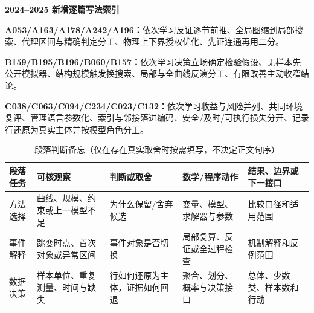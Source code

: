 \documentclass[withoutpreface,bwprint]{cumcmthesis}
\newif\ifmcmguidance
\newcommand{\MCMGuideField}[2]{\par\noindent\textbf{#1：}#2}
\newcommand{\MCMGuide}[7]{%
  \ifmcmguidance
    \begin{mcmguidebox}
      \small\color{black}
      {\color{mcmguidehead}\bfseries 写作指引}
      \MCMGuideField{目标}{#1}
      \MCMGuideField{必备清单}{#2}
      \MCMGuideField{语言风格}{#3}
      \MCMGuideField{篇幅与排版}{#4}
      \MCMGuideField{图表位置}{#5}
      \MCMGuideField{高分点}{#6}
      \MCMGuideField{错误警示}{#7}
    \end{mcmguidebox}
  \fi
}
\newcommand{\MCMCorpusScope}{2020--2025 年 A/B/C 题 59 篇编号论文，共 2892 页}
\newcommand{\MCMTotalLength}{全篇总页数参考为 45 [37,58.5] 页，不作为硬性页数限制}
\newcommand{\MCMAbstractLength}{摘要检出 58/59，跨度参考 1 [1,1] 页}
\begin{document}
  \begin{mcmguidebox}
    \small
    {\color{mcmguidehead}\bfseries 2024--2025 新增逐篇写法索引}
    \MCMGuideField{A053/A163/A178/A242/A196}{依次学习反证逐节前推、全局图缩到局部搜索、代理区间与精确判定分工、物理上下界授权优化、先证连通再用二分。}
    \MCMGuideField{B159/B195/B196/B060/B157}{依次学习决策立场确定检验假设、无样本先公开模拟器、结构规模触发换搜索、局部与全曲线反演分工、有限改善主动收窄结论。}
    \MCMGuideField{C038/C063/C094/C234/C023/C132}{依次学习收益与风险并列、共同环境复评、管理语言参数化、索引与邻接落进编码、安全/及时/可执行损失分开、记录行还原为真实主体并按模型角色分工。}
  \end{mcmguidebox}

  \begin{table}[H]
    \centering
    \small
    \caption{段落判断备忘（仅在存在真实取舍时按需填写，不决定正文句序）}
    \label{tab:human-paragraph-action-guide}
    \begin{tabular}{p{2.15cm}p{2.7cm}p{2.65cm}p{2.65cm}p{2.55cm}}
      \toprule
      段落任务 & 可核观察 & 判断或取舍 & 数学/程序动作 & 结果、边界或下一接口 \\
      \midrule
      方法选择 & 曲线、规模、约束或上一模型不足 & 为什么保留/舍弃候选 & 变量、模型、求解器与参数 & 比较口径和适用范围 \\
      事件解释 & 跳变时点、首次对象或异常区间 & 事件对象是否切换 & 局部复算、反证或全过程检查 & 机制解释和反例范围 \\
      数据决策 & 样本单位、重复测量、时间与缺失 & 行如何还原为主体，证据如何回退 & 聚合、划分、概率与决策接口 & 总体、少数类、样本数和行动 \\
      \bottomrule
    \end{tabular}
  \end{table}
\fi

\begin{abstract}
\MCMGuide
  {在一页内交代背景任务、逐问处理和主要结论，使摘要脱离正文仍能说明“研究什么、怎样算、得到什么”。}
  {总任务；逐问模型链；最有判别力的数值或关系；约束满足情况；至少一项检验；4--6 个关键词。}
  {按“虎头—猪肚—豹尾”压缩成三段：第一段交代背景、对象和全部任务；第二段按问题写处理思路、数据动作、模型/算法和关键结果；第三段只写有证据的创新、稳定性或应用价值。每段从本题对象起笔，不把算法名堆成清单。}
  {\MCMCorpusScope；\MCMTotalLength；\MCMAbstractLength。摘要不分小标题且不超过一页，结果数字与正文保持一致。}
  {摘要通常不插图表；只有题面明确要求摘要表格时才例外。}
  {让评阅者在首屏看见模型差异、关键结果和可信度证据。}
  {不写“结果很好”；不遗漏某一问；不填正文没有出现的数字；不把算法名堆成清单。}
\ifmcmguidance
  \keywords{关键词一\quad 关键词二\quad 关键词三}
\else
  \keywords{}
\fi
\end{abstract}
\end{document}

